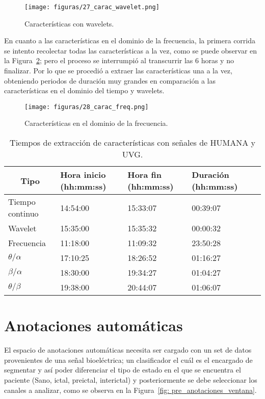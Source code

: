 \begin{figure}[H]
    \centering
    \texttt{[image: figuras/27\_carac\_wavelet.png]}
    \caption{Características con wavelets.}
    \label{fig: carac_wavelets}
\end{figure}

En cuanto a las características en el dominio de la frecuencia, la primera corrida se intento recolectar todas las características a la vez, como se puede observar en la Figura~\ref{fig: carac_freq}; pero el proceso se interrumpió al transcurrir las 6 horas y no finalizar. Por lo que se procedió a extraer las características una a la vez, obteniendo periodos de duración muy grandes en comparación a las características en el dominio del tiempo y wavelets. 

\begin{figure}[t]
    \centering
    \texttt{[image: figuras/28\_carac\_freq.png]}
    \caption{Características en el dominio de la frecuencia.}
    \label{fig: carac_freq}
\end{figure}

\begin{table}[H]
\begin{center}
\begin{tabular}{|l|l|l|l|l|}
\hline
        \multicolumn{1}{|c|}{\textbf{Tipo}} &
   \textbf{ Hora inicio (hh:mm:ss)} & \textbf{Hora fin (hh:mm:ss)} & \textbf{Duración (hh:mm:ss)}   \\ \hline
    Tiempo continuo     & 14:54:00  & 15:33:07 & 00:39:07   \\ \hline
    Wavelet             & 15:35:00  & 15:35:32 & 00:00:32   \\ \hline
    Frecuencia          & 11:18:00  & 11:09:32 & 23:50:28   \\ \hline
    $\theta/\alpha$     & 17:10:25  & 18:26:52 & 01:16:27   \\ \hline
    $\beta/\alpha $     & 18:30:00  & 19:34:27 & 01:04:27   \\ \hline
    $\theta/\beta $     & 19:38:00  & 20:44:07 & 01:06:07   \\ \hline
\end{tabular}
\caption[Tiempos de extracción de características]{Tiempos de extracción de características con señales de HUMANA y UVG.} 
\label{cuadro:Duracion caracteristicas}
\end{center}
\end{table}

\section{Anotaciones automáticas}
El espacio de anotaciones automáticas necesita ser cargado con un set de datos provenientes de una señal bioeléctrica; un clasificador el cuál es el encargado de segmentar y así poder diferenciar el tipo de estado en el que se encuentra el paciente (Sano, ictal, preictal, interictal) y posteriormente se debe seleccionar los canales a analizar, como se observa en la Figura~\ref{fig: pre_anotaciones_ventana}. 

